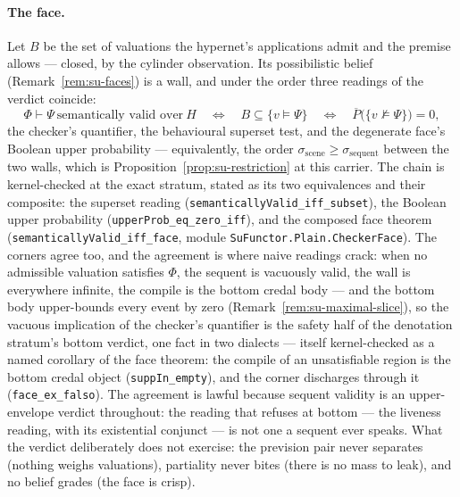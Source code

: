 \paragraph{The face.} Let $B$ be the set of valuations the
hypernet's applications admit and the premise allows --- closed, by
the cylinder observation. Its possibilistic belief
(Remark~\ref{rem:su-faces}) is a wall, and under the order three
readings of the verdict coincide:
\[
  \Phi \vdash \Psi \ \text{semantically valid over}\ H
  \quad\Longleftrightarrow\quad
  B \subseteq \{v \models \Psi\}
  \quad\Longleftrightarrow\quad
  \overline{P}\bigl(\{v \not\models \Psi\}\bigr) = 0 ,
\]
the checker's quantifier, the behavioural superset test, and the
degenerate face's Boolean upper probability --- equivalently, the
order $\sigma_{\mathrm{scene}} \ge \sigma_{\mathrm{sequent}}$
between the two walls, which is
Proposition~\ref{prop:su-restriction} at this carrier. The chain is
kernel-checked at the exact stratum, stated as its two equivalences
and their composite: the superset reading
(\texttt{semanticallyValid\_iff\_subset}), the Boolean upper
probability (\texttt{upperProb\_eq\_zero\_iff}), and the composed
face theorem (\texttt{semanticallyValid\_iff\_face}, module
\texttt{SuFunctor.Plain.CheckerFace}). The corners
agree too, and the agreement is where naive readings crack: when no
admissible valuation satisfies $\Phi$, the sequent is vacuously
valid, the wall is everywhere infinite, the compile is the bottom
credal body --- and the bottom body upper-bounds every event by
zero (Remark~\ref{rem:su-maximal-slice}), so the vacuous
implication of the checker's quantifier is the safety half of the
denotation stratum's bottom verdict, one fact in two dialects ---
itself kernel-checked as a named corollary of the face theorem: the
compile of an unsatisfiable region is the bottom credal object
(\texttt{suppIn\_empty}), and the corner discharges through it
(\texttt{face\_ex\_falso}). The agreement is lawful because
sequent validity is an upper-envelope verdict throughout:
the reading that refuses at bottom --- the liveness reading, with
its existential conjunct --- is not one a sequent ever speaks. What the
verdict deliberately does not exercise: the prevision pair never
separates (nothing weighs valuations), partiality never bites
(there is no mass to leak), and no belief grades (the face is
crisp).


